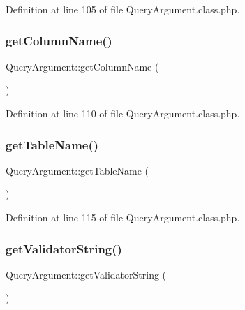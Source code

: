 Definition at line 105 of file Query\+Argument.\+class.\+php.

\hypertarget{classQueryArgument_aa0ee6b3b56a5c9de48fe073f84f818bc}{}\label{classQueryArgument_aa0ee6b3b56a5c9de48fe073f84f818bc} 
\subsubsection{\texorpdfstring{get\+Column\+Name()}{getColumnName()}}
{\footnotesize\ttfamily Query\+Argument\+::get\+Column\+Name (\begin{DoxyParamCaption}{ }\end{DoxyParamCaption})}



Definition at line 110 of file Query\+Argument.\+class.\+php.

\hypertarget{classQueryArgument_a0cd81646f06d0b3d8ed92977498fd7aa}{}\label{classQueryArgument_a0cd81646f06d0b3d8ed92977498fd7aa} 
\subsubsection{\texorpdfstring{get\+Table\+Name()}{getTableName()}}
{\footnotesize\ttfamily Query\+Argument\+::get\+Table\+Name (\begin{DoxyParamCaption}{ }\end{DoxyParamCaption})}



Definition at line 115 of file Query\+Argument.\+class.\+php.

\hypertarget{classQueryArgument_a457e607f0cc0ec072e00f0bc5c3898fd}{}\label{classQueryArgument_a457e607f0cc0ec072e00f0bc5c3898fd} 
\subsubsection{\texorpdfstring{get\+Validator\+String()}{getValidatorString()}}
{\footnotesize\ttfamily Query\+Argument\+::get\+Validator\+String (\begin{DoxyParamCaption}{ }\end{DoxyParamCaption})}



